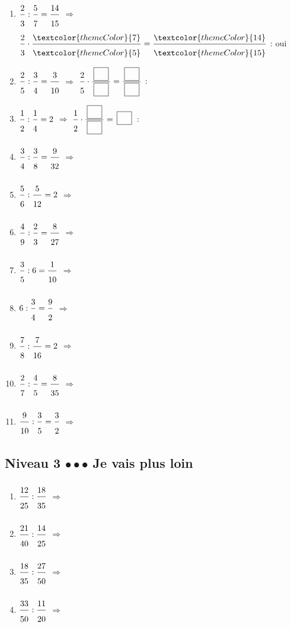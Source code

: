 \begin{enumerate}[leftmargin=*,align=parleft, label=\alph*), itemsep=9pt]
\item $\FA{2}{3}:\FA{5}{7}=\FA{14}{15}$ \quad $\Longrightarrow$ \quad $\FA{2}{3}\cdot\FA{\textcolor{themeColor}{7}}{\textcolor{themeColor}{5}}=\FA{\textcolor{themeColor}{14}}{\textcolor{themeColor}{15}}$ \quad : \quad \textcolor{themeColor}{oui}
\item $\FA{2}{5}:\FA{3}{4}=\FA{3}{10}$ \quad $\Longrightarrow$ \quad $\FA{2}{5}\cdot\FA{\CaseC}{\CaseC}=\FA{\CaseC}{\CaseC}$ \quad : \quad \Case
\item $\FA{1}{2}:\FA{1}{4}=2$ \quad $\Longrightarrow$ \quad $\FA{1}{2}\cdot\FA{\CaseC}{\CaseC}=\CaseC$ \quad : \quad \Case
\item $\FA{3}{4}:\FA{3}{8}=\FA{9}{32}$ \quad $\Longrightarrow$
\item $\FA{5}{6}:\FA{5}{12}=2$ \quad $\Longrightarrow$
\item $\FA{4}{9}:\FA{2}{3}=\FA{8}{27}$ \quad $\Longrightarrow$
\item $\FA{3}{5}:6=\FA{1}{10}$ \quad $\Longrightarrow$
\item $6:\FA{3}{4}=\FA{9}{2}$ \quad $\Longrightarrow$
\item $\FA{7}{8}:\FA{7}{16}=2$ \quad $\Longrightarrow$
\item $\FA{2}{7}:\FA{4}{5}=\FA{8}{35}$ \quad $\Longrightarrow$
\item $\FA{9}{10}:\FA{3}{5}=\FA{3}{2}$ \quad $\Longrightarrow$
\end{enumerate}
 
\newpage
\subsection{Niveau 3 \quad $\bullet\bullet\bullet$ \quad Je vais plus loin}
 
 
\begin{enumerate}[leftmargin=*,align=parleft, label=\alph*), itemsep=9pt]
\item $\FA{12}{25}:\FA{18}{35}$ \quad $\Longrightarrow$
\item $\FA{21}{40}:\FA{14}{25}$ \quad $\Longrightarrow$
\item $\FA{18}{35}:\FA{27}{50}$ \quad $\Longrightarrow$
\item $\FA{33}{50}:\FA{11}{20}$ \quad $\Longrightarrow$
\end{enumerate}
 
